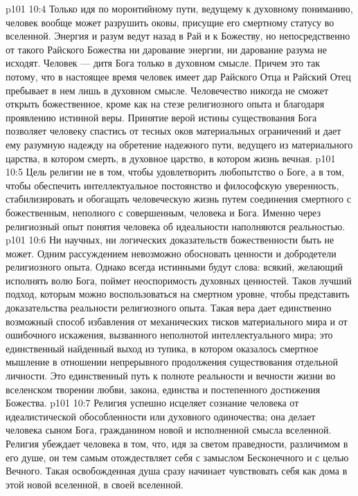 \vs p101 10:4 Только идя по моронтийному пути, ведущему к духовному пониманию, человек вообще может разрушить оковы, присущие его смертному статусу во вселенной. Энергия и разум ведут назад в Рай и к Божеству, но непосредственно от такого Райского Божества ни дарование энергии, ни дарование разума не исходят. Человек --- дитя Бога только в духовном смысле. Причем это так потому, что в настоящее время человек имеет дар Райского Отца и Райский Отец пребывает в нем лишь в духовном смысле. Человечество никогда не сможет открыть божественное, кроме как на стезе религиозного опыта и благодаря проявлению истинной веры. Принятие верой истины существования Бога позволяет человеку спастись от тесных оков материальных ограничений и дает ему разумную надежду на обретение надежного пути, ведущего из материального царства, в котором смерть, в духовное царство, в котором жизнь вечная.
\vs p101 10:5 \pc Цель религии не в том, чтобы удовлетворить любопытство о Боге, а в том, чтобы обеспечить интеллектуальное постоянство и философскую уверенность, стабилизировать и обогащать человеческую жизнь путем соединения смертного с божественным, неполного с совершенным, человека и Бога. Именно через религиозный опыт понятия человека об идеальности наполняются реальностью.
\vs p101 10:6 \pc Ни научных, ни логических доказательств божественности быть не может. Одним рассуждением невозможно обосновать ценности и добродетели религиозного опыта. Однако всегда истинными будут слова: всякий, желающий исполнять волю Бога, поймет неоспоримость духовных ценностей. Таков лучший подход, которым можно воспользоваться на смертном уровне, чтобы представить доказательства реальности религиозного опыта. Такая вера дает единственно возможный способ избавления от механических тисков материального мира и от ошибочного искажения, вызванного неполнотой интеллектуального мира; это единственный найденный выход из тупика, в котором оказалось смертное мышление в отношении непрерывного продолжения существования отдельной личности. Это единственный путь к полноте реальности и вечности жизни во вселенском творении любви, закона, единства и постепенного достижения Божества.
\vs p101 10:7 Религия успешно исцеляет сознание человека от идеалистической обособленности или духовного одиночества; она делает человека сыном Бога, гражданином новой и исполненной смысла вселенной. Религия убеждает человека в том, что, идя за светом праведности, различимом в его душе, он тем самым отождествляет себя с замыслом Бесконечного и с целью Вечного. Такая освобожденная душа сразу начинает чувствовать себя как дома в этой новой вселенной, в своей вселенной.

